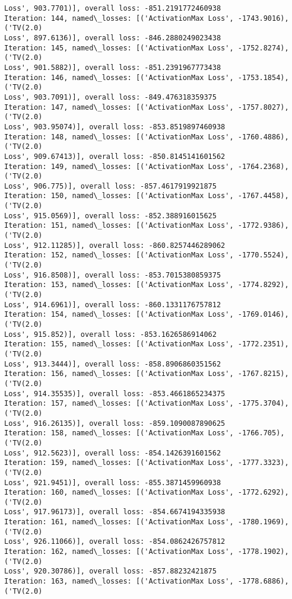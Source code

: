\documentclass[10pt]{article}
\begin{document}
\begin{Verbatim}[commandchars=\\\{\}]
Loss', 903.7701)], overall loss: -851.2191772460938
Iteration: 144, named\_losses: [('ActivationMax Loss', -1743.9016), ('TV(2.0)
Loss', 897.6136)], overall loss: -846.2880249023438
Iteration: 145, named\_losses: [('ActivationMax Loss', -1752.8274), ('TV(2.0)
Loss', 901.5882)], overall loss: -851.2391967773438
Iteration: 146, named\_losses: [('ActivationMax Loss', -1753.1854), ('TV(2.0)
Loss', 903.7091)], overall loss: -849.476318359375
Iteration: 147, named\_losses: [('ActivationMax Loss', -1757.8027), ('TV(2.0)
Loss', 903.95074)], overall loss: -853.8519897460938
Iteration: 148, named\_losses: [('ActivationMax Loss', -1760.4886), ('TV(2.0)
Loss', 909.67413)], overall loss: -850.8145141601562
Iteration: 149, named\_losses: [('ActivationMax Loss', -1764.2368), ('TV(2.0)
Loss', 906.775)], overall loss: -857.4617919921875
Iteration: 150, named\_losses: [('ActivationMax Loss', -1767.4458), ('TV(2.0)
Loss', 915.0569)], overall loss: -852.388916015625
Iteration: 151, named\_losses: [('ActivationMax Loss', -1772.9386), ('TV(2.0)
Loss', 912.11285)], overall loss: -860.8257446289062
Iteration: 152, named\_losses: [('ActivationMax Loss', -1770.5524), ('TV(2.0)
Loss', 916.8508)], overall loss: -853.7015380859375
Iteration: 153, named\_losses: [('ActivationMax Loss', -1774.8292), ('TV(2.0)
Loss', 914.6961)], overall loss: -860.1331176757812
Iteration: 154, named\_losses: [('ActivationMax Loss', -1769.0146), ('TV(2.0)
Loss', 915.852)], overall loss: -853.1626586914062
Iteration: 155, named\_losses: [('ActivationMax Loss', -1772.2351), ('TV(2.0)
Loss', 913.3444)], overall loss: -858.8906860351562
Iteration: 156, named\_losses: [('ActivationMax Loss', -1767.8215), ('TV(2.0)
Loss', 914.35535)], overall loss: -853.4661865234375
Iteration: 157, named\_losses: [('ActivationMax Loss', -1775.3704), ('TV(2.0)
Loss', 916.26135)], overall loss: -859.1090087890625
Iteration: 158, named\_losses: [('ActivationMax Loss', -1766.705), ('TV(2.0)
Loss', 912.5623)], overall loss: -854.1426391601562
Iteration: 159, named\_losses: [('ActivationMax Loss', -1777.3323), ('TV(2.0)
Loss', 921.9451)], overall loss: -855.3871459960938
Iteration: 160, named\_losses: [('ActivationMax Loss', -1772.6292), ('TV(2.0)
Loss', 917.96173)], overall loss: -854.6674194335938
Iteration: 161, named\_losses: [('ActivationMax Loss', -1780.1969), ('TV(2.0)
Loss', 926.11066)], overall loss: -854.0862426757812
Iteration: 162, named\_losses: [('ActivationMax Loss', -1778.1902), ('TV(2.0)
Loss', 920.30786)], overall loss: -857.88232421875
Iteration: 163, named\_losses: [('ActivationMax Loss', -1778.6886), ('TV(2.0)

\end{Verbatim}
\end{document}
